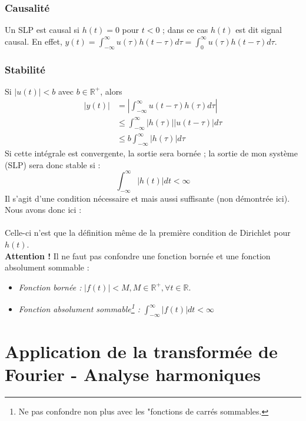 \subsubsection{Causalité}
Un SLP est causal si $h(t) =0$ pour $t<0$ ; dans ce cas $h(t)$ est dit 
signal causal. En effet, $y(t) = \int_{-\infty}^\infty u(\tau)h(t-\tau)d\tau = 
\int_0^\infty u(\tau)h(t-\tau)d\tau$.
	
\subsubsection{Stabilité}
Si $|u(t)| < b$ avec $b\in\mathbb{R}^+$, alors 
\begin{equation}
	\begin{array}{ll}
		|y(t)| & = |\int_{-\infty}^\infty u(t-\tau)h(\tau)d\tau|      \\
		       & \leq \int_{-\infty}^\infty |h(\tau)||u(t-\tau)|d\tau \\
		       & \leq b\int_{-\infty}^\infty|h(\tau)|d\tau            
	\end{array}
\end{equation}
Si cette intégrale est convergente, la sortie sera bornée ; la sortie de mon 
système (SLP) sera donc stable si :
\begin{equation}
	\int_{-\infty}^\infty |h(t)|dt < \infty
\end{equation}
Il s'agit d'une condition nécessaire et mais aussi suffisante (non démontrée ici).
Nous avons donc ici :\\
		
\ \\
Celle-ci n'est que la définition même de la première condition de Dirichlet pour
$h(t)$.\\
\textbf{Attention !} Il ne faut pas confondre une fonction bornée et une fonction
absolument sommable :
\begin{itemize}
	\item \textit{Fonction bornée :} $|f(t)| < M, M\in \mathbb{R}^+, \forall t \in 
	      \mathbb{R}$.
	\item \textit{Fonction absolument sommable\footnote{Ne pas confondre non plus avec les 
	            "fonctions de carrés sommables.} :} $ \int_{-\infty}^\infty |f(t)|dt < \infty$
\end{itemize}
		
\section{Application de la transformée de Fourier - Analyse harmoniques}

